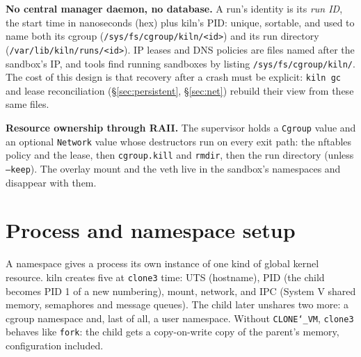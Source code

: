 \documentclass[10pt,letterpaper]{article}
\newcommand{\code}[1]{\texttt{#1}}
\newcommand{\us}{\char`\_}
\begin{document}
\textbf{No central manager daemon, no database.} A run's identity is its \emph{run ID}, the start
time in nanoseconds (hex) plus kiln's PID: unique, sortable, and used to name both
its cgroup (\code{/sys/fs/cgroup/kiln/<id>}) and its run directory
(\code{/var/lib/kiln/runs/<id>}). IP leases and DNS policies are files named
after the sandbox's IP, and tools find running sandboxes by listing
\code{/sys/fs/cgroup/kiln/}. The cost of this design is that recovery after a crash
must be explicit: \code{kiln gc} and lease reconciliation (\S\ref{sec:persistent},
\S\ref{sec:net}) rebuild their view from these same files.

\textbf{Resource ownership through RAII.} The supervisor holds a \code{Cgroup}
value and an optional \code{Network} value whose destructors run on every exit
path: the nftables policy and the lease, then \code{cgroup.kill} and
\code{rmdir}, then the run directory (unless \code{--keep}). The overlay mount
and the veth live in the sandbox's namespaces and disappear with them.

\section{Process and namespace setup}
\label{sec:startup}

A namespace gives a process its own instance of one kind of global kernel
resource. kiln creates five at \code{clone3} time: UTS (hostname), PID (the child
becomes PID 1 of a new numbering), mount, network, and IPC (System V shared
memory, semaphores and message queues). The child later unshares two more: a
cgroup namespace and, last of all, a user namespace. Without \code{CLONE\us{}VM}, \code{clone3} behaves like \code{fork}: the child gets a copy-on-write copy of the parent's memory, configuration included.
\end{document}

